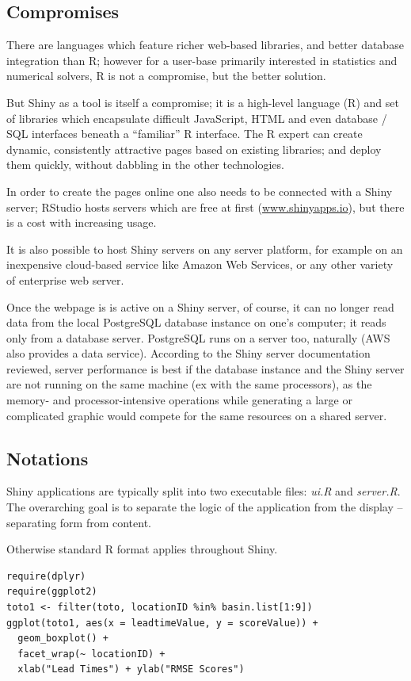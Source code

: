 \documentclass[logos,parttoc,morelanguage=french,morelanguage=german,draft]{orsay-memoire}
\begin{document}
\subsection{Compromises}
There are languages which feature richer web-based libraries, and better database integration than R; however for a user-base primarily interested in statistics and numerical solvers, R is not a compromise, but the better solution.

But Shiny as a tool is itself a compromise; it is a high-level language (R) and set of libraries which encapsulate difficult JavaScript, HTML and even database / SQL interfaces beneath a ``familiar'' R interface. The R expert can create dynamic, consistently attractive pages based on existing libraries; and deploy them quickly, without dabbling in the other technologies.

In order to create the pages online one also needs to be connected with a Shiny server; RStudio hosts servers which are free at first (\href{https://www.shinyapps.io/}{www.shinyapps.io}), but there is a cost with increasing usage.

It is also possible to host Shiny servers on any server platform, for example on an inexpensive cloud-based service like Amazon Web Services, or any other variety of enterprise web server.

Once the webpage is is active on a Shiny server, of course, it can no longer read data from the local PostgreSQL database instance on one's computer; it reads only from a database server. PostgreSQL runs on a server too, naturally (AWS also provides a data service). According to the Shiny server documentation reviewed, server performance is best if the database instance and the Shiny server are not running on the same machine (ex with the same processors), as the memory- and processor-intensive operations while generating a large or complicated graphic would compete for the same resources on a shared server.

\subsection{Notations}
Shiny applications are typically split into two executable files: \textit{ui.R} and \textit{server.R}. The overarching goal is to separate the logic of the application from the display -- separating form from content.

Otherwise standard R format applies throughout Shiny.

\begin{verbatim}
require(dplyr)
require(ggplot2)
toto1 <- filter(toto, locationID %in% basin.list[1:9])
ggplot(toto1, aes(x = leadtimeValue, y = scoreValue)) +
  geom_boxplot() +
  facet_wrap(~ locationID) +
  xlab("Lead Times") + ylab("RMSE Scores")
\end{verbatim}
\end{document}
